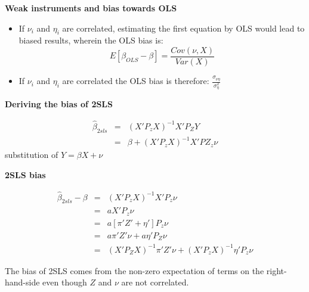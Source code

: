 \documentclass[notes=show]{beamer}
\begin{document}
\begin{frame}[plain]
\begin{center}
	\textbf{Weak instruments and bias towards OLS}
\end{center}

\begin{itemize}
	\item If $\nu_i$ and $\eta_i$ are correlated, estimating the first equation by OLS would lead to biased results, wherein the OLS bias is:$$E[\beta_{OLS} - \beta] = \frac{ Cov(\nu, X)}{Var(X)}$$
	\item If $\nu_i$ and $\eta_i$ are correlated the OLS bias is therefore: $\frac{\sigma_{\nu \eta}}{\sigma^2_\eta}$
\end{itemize}

\end{frame}


\begin{frame}[plain]
\begin{center}
\textbf{Deriving the bias of 2SLS}
\end{center}

\begin{eqnarray*}
\widehat{\beta}_{2sls} &=& (X'P_zX)^{-1}X'P_ZY \\
&=& \beta + (X'P_zX)^{-1}X'PZ_z \nu
\end{eqnarray*}substitution of $Y=\beta X + \nu$

\end{frame}


\begin{frame}[plain]
\begin{center}
\textbf{2SLS bias}
\end{center}

\begin{eqnarray*}
\widehat{\beta}_{2sls} - \beta &=& (X'P_zX)^{-1}X'P_z\nu \\
&=&aX'P_z \nu \\
&=&a[\pi ' Z' + \eta ']P_z \nu \\
&=&a \pi' Z' \nu + a \eta ' P_Z \nu \\
&=& (X'P_Z X)^{-1} \pi ' Z ' \nu + (X'P_zX)^{-1} \eta ' P_z \nu
\end{eqnarray*}

The bias of 2SLS comes from the non-zero expectation of terms on the right-hand-side even though $Z$ and $\nu$ are not correlated. 

\end{frame}
\end{document}
